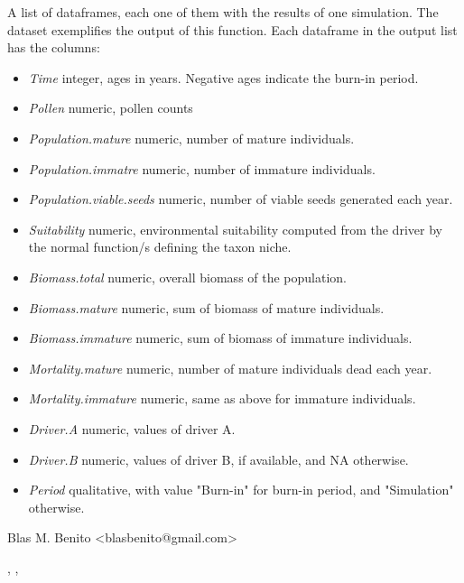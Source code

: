 \documentclass[letterpaper]{book}
\begin{document}
%
\begin{Value}
A list of dataframes, each one of them with the results of one simulation. The dataset  exemplifies the output of this function. Each dataframe in the output list has the columns:
\begin{itemize}

\item \emph{Time} integer, ages in years. Negative ages indicate the burn-in period.
\item \emph{Pollen} numeric, pollen counts
\item \emph{Population.mature} numeric, number of mature individuals.
\item \emph{Population.immatre} numeric, number of immature individuals.
\item \emph{Population.viable.seeds} numeric, number of viable seeds generated each year.
\item \emph{Suitability} numeric, environmental suitability computed from the driver by the normal function/s defining the taxon niche.
\item \emph{Biomass.total} numeric, overall biomass of the population.
\item \emph{Biomass.mature} numeric, sum of biomass of mature individuals.
\item \emph{Biomass.immature} numeric, sum of biomass of immature individuals.
\item \emph{Mortality.mature} numeric, number of mature individuals dead each year.
\item \emph{Mortality.immature} numeric, same as above for immature individuals.
\item \emph{Driver.A} numeric, values of driver A.
\item \emph{Driver.B} numeric, values of driver B, if available, and NA otherwise.
\item \emph{Period} qualitative, with value "Burn-in" for burn-in period, and "Simulation" otherwise.

\end{itemize}

\end{Value}
%
\begin{Author}\relax
Blas M. Benito  <blasbenito@gmail.com>
\end{Author}
%
\begin{SeeAlso}\relax
{}, , 
\end{SeeAlso}
\end{document}
